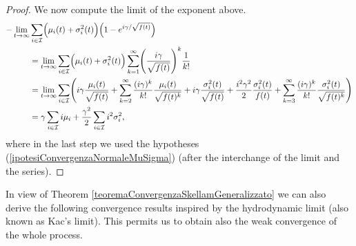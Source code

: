 \documentclass[12pt, twoside, english, headsepline]{article}
\theoremstyle{definition} %
\numberwithin{equation}{section} %
\begin{document}
\begin{proof}
We now compute the limit of the exponent above.
\begin{align*}
- \lim_{t\rightarrow \infty} &\sum_{i\in\mathcal{I}}\Bigl(\mu_i(t) +\sigma^2_i (t)\Bigr)\Bigl(1-e^{i \gamma/\sqrt{f(t)}}\Bigr)\\
&= \lim_{t\rightarrow \infty}  \sum_{i\in\mathcal{I}}\Bigl(\mu_i(t) +\sigma^2_i(t)\Bigr)\sum_{k=1}^\infty \Biggl( \frac{i \gamma}{\sqrt{f(t)}}\Biggr)^k \frac{1}{k!} \\
& = \lim_{t\rightarrow \infty} \sum_{i\in\mathcal{I}} \Biggl( i\gamma \frac{\mu_i(t)}{\sqrt{f(t)}} + \sum_{k=2}^\infty \frac{(i \gamma)^k}{k!}\frac{\mu_i(t)}{\sqrt{f(t)^k}} + i\gamma \frac{\sigma^2_i(t)}{\sqrt{f(t)}} +  \frac{i^2\gamma^2}{2}\frac{\sigma^2_i(t)}{f(t)} +  \sum_{k=3}^\infty \frac{(i \gamma)^k}{k!}\frac{\sigma_i^2(t)}{\sqrt{f(t)^k}} \Biggr)\\
& =\gamma \sum_{i\in\mathcal{I}}i \mu_i +  \frac{\gamma^2}{2}\sum_{i\in\mathcal{I}}i^2 \sigma^2_i, %
\end{align*}
where in the last step we used the hypotheses (\ref{ipotesiConvergenzaNormaleMuSigma}) (after the interchange of the limit and the series).
\end{proof}


In view of Theorem \ref{teoremaConvergenzaSkellamGeneralizzato} we can also derive the following convergence results inspired by the hydrodynamic limit (also known as Kac's limit). This permits us to obtain also the weak convergence of the whole process.
\end{document}
